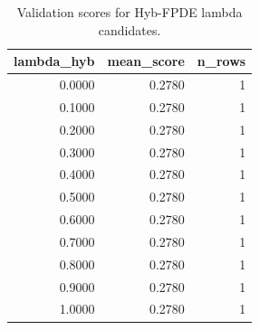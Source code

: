 \begin{table}[t]
\caption{Validation scores for Hyb-FPDE lambda candidates.}
\label{tab:lambda_distribution_computed}
\centering
\begin{tabular}{rrr}
\toprule
lambda\_hyb & mean\_score & n\_rows \\
\midrule
0.0000 & 0.2780 & 1 \\
0.1000 & 0.2780 & 1 \\
0.2000 & 0.2780 & 1 \\
0.3000 & 0.2780 & 1 \\
0.4000 & 0.2780 & 1 \\
0.5000 & 0.2780 & 1 \\
0.6000 & 0.2780 & 1 \\
0.7000 & 0.2780 & 1 \\
0.8000 & 0.2780 & 1 \\
0.9000 & 0.2780 & 1 \\
1.0000 & 0.2780 & 1 \\
\bottomrule
\end{tabular}

\end{table}
